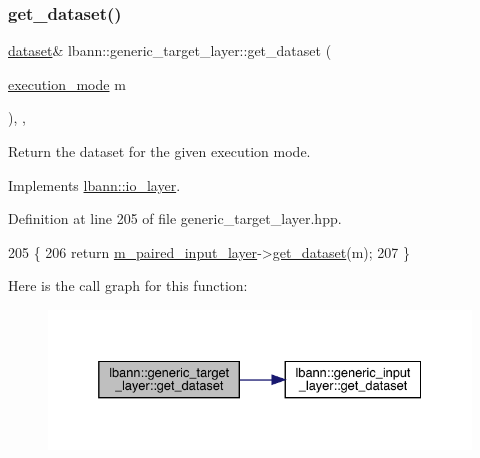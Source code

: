 \subsubsection{\texorpdfstring{get\+\_\+dataset()}{get\_dataset()}\hspace{0.1cm}{\footnotesize\ttfamily [1/2]}}
{\footnotesize\ttfamily \hyperlink{classlbann_1_1dataset}{dataset}\& lbann\+::generic\+\_\+target\+\_\+layer\+::get\+\_\+dataset (\begin{DoxyParamCaption}\item[{\hyperlink{base_8hpp_a2781a159088df64ed7d47cc91c4dc0a8}{execution\+\_\+mode}}]{m }\end{DoxyParamCaption})\hspace{0.3cm}{\ttfamily [inline]}, {\ttfamily [override]}, {\ttfamily [virtual]}}

Return the dataset for the given execution mode. 

Implements \hyperlink{classlbann_1_1io__layer_a027122c10603ede2ab9be779bad135f8}{lbann\+::io\+\_\+layer}.



Definition at line 205 of file generic\+\_\+target\+\_\+layer.\+hpp.


\begin{DoxyCode}
205                                                   \{
206     \textcolor{keywordflow}{return} \hyperlink{classlbann_1_1generic__target__layer_a84da1260e9feb4fbc3e6f2315e4cab4b}{m\_paired\_input\_layer}->\hyperlink{classlbann_1_1generic__input__layer_af5699540797c22d8846028e578a6fc59}{get\_dataset}(m);
207   \}
\end{DoxyCode}
Here is the call graph for this function\+:\nopagebreak
\begin{figure}[H]
\begin{center}
\leavevmode
\includegraphics[width=332pt]{classlbann_1_1generic__target__layer_af2a0f4313863a029263efd0fced40571_cgraph}
\end{center}
\end{figure}
\mbox{\label{classlbann_1_1generic__target__layer_a76569f34b5af75d6b822fb3349f7406f}} 

